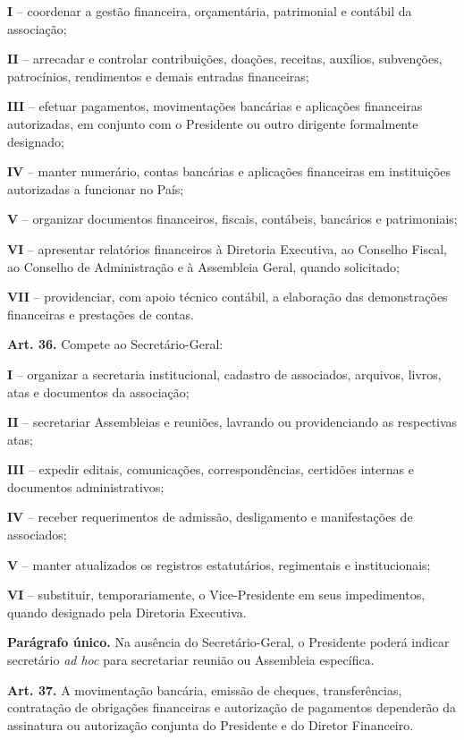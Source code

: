 \documentclass[11pt,a4paper]{article}
\begin{document}
\textbf{I} -- coordenar a gestão financeira, orçamentária, patrimonial e contábil da associação;

\textbf{II} -- arrecadar e controlar contribuições, doações, receitas, auxílios, subvenções, patrocínios, rendimentos e demais entradas financeiras;

\textbf{III} -- efetuar pagamentos, movimentações bancárias e aplicações financeiras autorizadas, em conjunto com o Presidente ou outro dirigente formalmente designado;

\textbf{IV} -- manter numerário, contas bancárias e aplicações financeiras em instituições autorizadas a funcionar no País;

\textbf{V} -- organizar documentos financeiros, fiscais, contábeis, bancários e patrimoniais;

\textbf{VI} -- apresentar relatórios financeiros à Diretoria Executiva, ao Conselho Fiscal, ao Conselho de Administração e à Assembleia Geral, quando solicitado;

\textbf{VII} -- providenciar, com apoio técnico contábil, a elaboração das demonstrações financeiras e prestações de contas.

\textbf{Art. 36.} Compete ao Secretário-Geral:

\textbf{I} -- organizar a secretaria institucional, cadastro de associados, arquivos, livros, atas e documentos da associação;

\textbf{II} -- secretariar Assembleias e reuniões, lavrando ou providenciando as respectivas atas;

\textbf{III} -- expedir editais, comunicações, correspondências, certidões internas e documentos administrativos;

\textbf{IV} -- receber requerimentos de admissão, desligamento e manifestações de associados;

\textbf{V} -- manter atualizados os registros estatutários, regimentais e institucionais;

\textbf{VI} -- substituir, temporariamente, o Vice-Presidente em seus impedimentos, quando designado pela Diretoria Executiva.

\textbf{Parágrafo único.} Na ausência do Secretário-Geral, o Presidente poderá indicar secretário \textit{ad hoc} para secretariar reunião ou Assembleia específica.

\textbf{Art. 37.} A movimentação bancária, emissão de cheques, transferências, contratação de obrigações financeiras e autorização de pagamentos dependerão da assinatura ou autorização conjunta do Presidente e do Diretor Financeiro.
\end{document}
